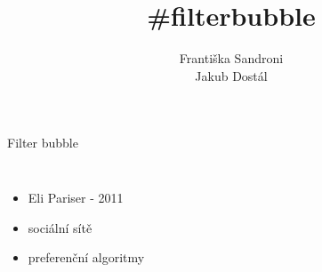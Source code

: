 \documentclass[notheorems,12pt]{beamer}
\title[]{\#filterbubble}
\date{}
\author{Františka Sandroni\\
        Jakub Dostál}
\institute{}
\begin{document}
\maketitle
\begin{frame}{Filter bubble}
    \begin{columns}
    \column{5cm}
    \begin{itemize}
        \item Eli Pariser - 2011
        \vspace{0.03cm}
        \item sociální sítě
        \vspace{0.03cm}
        \item preferenční algoritmy
    \end{itemize}
    \column{6cm}
        \begin{figure}
            \centering
            \vspace{-0.5cm}
            \\
            \vspace{0.5cm}

\end{figure}
\end{columns}
\end{frame}
\end{document}
